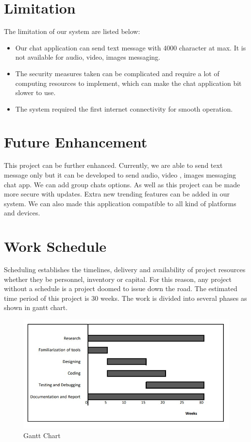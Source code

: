 \section{Limitation}
The limitation of our system are listed below:
\vspace{-18pt}
\begin{itemize}
	\item Our chat application can send text message with 4000 character  at max. It is not available for audio, video, images messaging.
	\item The security measures taken can be complicated and require a lot of computing resources to implement, which can make the chat application bit slower to use.
	\item The system required the first internet connectivity for smooth operation.
\end{itemize}
\section{Future Enhancement}
This project can be further enhanced. Currently, we are able to send text message only but it can be developed to
send audio, video , images messaging chat app. We can add group chats options. As well as this project can be made more
secure with updates. Extra new trending features can be added in our system. We can also made this application compatible to all kind
of platforms and devices.

\section{Work Schedule}
Scheduling establishes the timelines, delivery and availability of project
resources whether they be personnel, inventory or capital. For this reason,
any project without a schedule is a project doomed to issue down the road.
The estimated time period of this project is 30 weeks. The work is divided into several
phases as shown in gantt chart.

\begin{figure}[H]
	\centering
	\includegraphics[width=160mm]{images/ganttchart.png.jpg}
	\caption{Gantt Chart} %
	\label{figganttchart} %
\end{figure}

